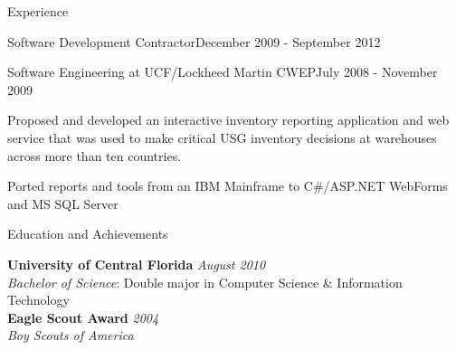 \documentclass{resume} %
\begin{document}
\begin{rSection}{Experience}
\begin{rSubsection}{Software Development Contractor}{December 2009 - September 2012}{}{}
\end{rSubsection}


\begin{rSubsection}{Software Engineering at UCF/Lockheed Martin CWEP}{July 2008 - November 2009}{}{}

\item Proposed and developed an interactive inventory reporting application and web service that was used to make critical USG inventory decisions at warehouses across more than ten countries.
\item Ported reports and tools from an IBM Mainframe to C\#/ASP.NET WebForms and MS SQL Server

\end{rSubsection}


\end{rSection}


\begin{rSection}{Education and Achievements}

{\bf University of Central Florida} \hfill {\em August 2010} \\ 
\textit{Bachelor of Science}: Double major in Computer Science \& Information Technology \\
{\bf Eagle Scout Award} \hfill {\em 2004} \\ 
\textit{Boy Scouts of America} \\
\end{rSection}





\end{document}
